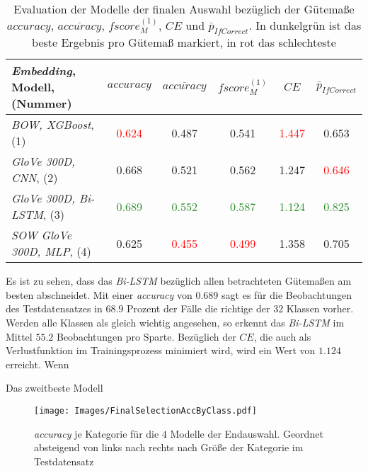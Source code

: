 \documentclass[a4paper,11pt]{article}
\begin{document}
\begin{table}[ht]
\centering
\begin{tabular}{|l||ccccc|}
  \hline
\textit{Embedding}, Modell, (Nummer) & $accuracy$ & $\overline{accuracy}$ & $fscore_M^{(1)}$ & $CE$ & $\bar{p}_{IfCorrect}$ \\ 
  \hline
\textit{BOW, XGBoost}, (1) & \textcolor{red}{0.624} & 0.487 & 0.541 & \textcolor{red}{1.447} & 0.653 \\ 
  \textit{GloVe 300D, CNN}, (2) & 0.668 & 0.521 & 0.562 & 1.247 & \textcolor{red}{0.646} \\ 
  \textit{GloVe 300D, Bi-LSTM}, (3) & \textcolor{ForestGreen}{0.689} & \textcolor{ForestGreen}{0.552} & \textcolor{ForestGreen}{0.587} & \textcolor{ForestGreen}{1.124} & \textcolor{ForestGreen}{0.825} \\ 
  \textit{SOW GloVe 300D, MLP}, (4) & 0.625 & \textcolor{red}{0.455} & \textcolor{red}{0.499} & 1.358 & 0.705 \\ 
   \hline
\end{tabular}
\label{tab:finalSelection}
\caption{Evaluation der Modelle der finalen Auswahl bezüglich der Gütemaße $accuracy$, $\overline{accuracy}$, $fscore_M^{(1)}$, $CE$ und  $\bar{p}_{IfCorrect}$. In dunkelgrün ist das beste Ergebnis pro Gütemaß markiert, in rot das schlechteste}
\end{table}

Es ist zu sehen, dass das \textit{Bi-LSTM} bezüglich allen betrachteten Gütemaßen am besten abschneidet. Mit einer \textit{accuracy} von $0.689$ sagt es für die Beobachtungen des Testdatensatzes in $68.9$ Prozent der Fälle die richtige der $32$ Klassen vorher. Werden alle Klassen als gleich wichtig angesehen, so erkennt das \textit{Bi-LSTM} im Mittel $55.2$ Beobachtungen pro Sparte. Bezüglich der $CE$, die auch als Verlustfunktion im Trainingsprozess minimiert wird, wird ein Wert von $1.124$ erreicht. Wenn 


Das zweitbeste Modell 





\begin{figure}[ht]
    \centering
\texttt{[image: Images/FinalSelectionAccByClass.pdf]} 
\caption{\textit{accuracy} je Kategorie für die $4$ Modelle der Endauswahl. Geordnet absteigend von links nach rechts nach Größe der Kategorie im Testdatensatz}
\label{abb:AccByClass}
\end{figure}
\end{document}
